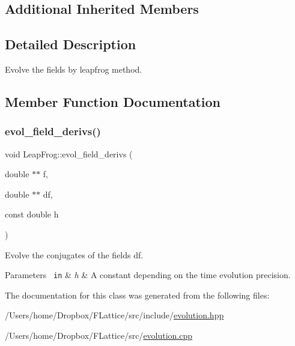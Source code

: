 \subsection*{Additional Inherited Members}


\subsection{Detailed Description}
Evolve the fields by leapfrog method. 

\subsection{Member Function Documentation}
\mbox{\label{class_leap_frog_a0798b7d6bfdf2f19e5bce08c4ce17d29}} 
\subsubsection{\texorpdfstring{evol\_field\_derivs()}{evol\_field\_derivs()}}
{\footnotesize\ttfamily void Leap\+Frog\+::evol\+\_\+field\+\_\+derivs (\begin{DoxyParamCaption}\item[{double $\ast$$\ast$}]{f,  }\item[{double $\ast$$\ast$}]{df,  }\item[{const double}]{h }\end{DoxyParamCaption})\hspace{0.3cm}{\ttfamily [private]}}



Evolve the conjugates of the fields df. 


\begin{DoxyParams}[1]{Parameters}
\mbox{\texttt{ in}}  & {\em h} & A constant depending on the time evolution precision. \\
\hline
\end{DoxyParams}


The documentation for this class was generated from the following files\+:\begin{DoxyCompactItemize}
\item 
/\+Users/home/\+Dropbox/\+F\+Lattice/src/include/\mbox{\hyperlink{evolution_8hpp}{evolution.\+hpp}}\item 
/\+Users/home/\+Dropbox/\+F\+Lattice/src/\mbox{\hyperlink{evolution_8cpp}{evolution.\+cpp}}\end{DoxyCompactItemize}
